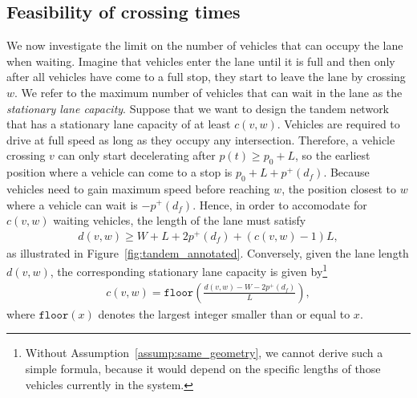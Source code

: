 \documentclass[a4paper]{article}
\theoremstyle{definition}
\theoremstyle{plain}
\begin{document}
\subsection{Feasibility of crossing times}

We now investigate the limit on the number of vehicles that can occupy the lane
when waiting. Imagine that vehicles enter the lane until it is full and then
only after all vehicles have come to a full stop, they start to leave the lane
by crossing $w$. We refer to the maximum number of vehicles that can wait in the
lane as the \textit{stationary lane capacity}.
%
Suppose that we want to design the tandem network that has a stationary lane
capacity of at least $c(v,w)$. Vehicles are required to drive at full speed as
long as they occupy any intersection. Therefore, a vehicle crossing $v$ can only
start decelerating after $p(t) \geq p_{0} + L$, so the earliest position where a
vehicle can come to a stop is $p_{0} + L + p^{+}(d_{f})$.
%
Because vehicles need to gain maximum speed before reaching $w$,
the position closest to $w$ where a vehicle can wait is $- p^{+}(d_{f})$.
%
Hence, in order to accomodate for $c(v,w)$ waiting vehicles, the length of the
lane must satisfy
\begin{align*}
  d(v, w) \geq W + L + 2p^{+}(d_{f}) + (c(v,w) - 1) L ,
\end{align*}
as illustrated in Figure~\ref{fig:tandem_annotated}.
%
Conversely, given the lane length $d(v,w)$, the corresponding stationary lane
capacity is given by\footnote{Without Assumption~\ref{assump:same_geometry}, we
  cannot derive such a simple formula, because it would depend on the specific
  lengths of those vehicles currently in the system.}
\begin{align*}
  c(v, w) = \texttt{floor}\left( \frac{d(v,w) - W - 2 p^{+}(d_{f})}{L} \right) ,
\end{align*}
where $\texttt{floor}(x)$ denotes the largest integer smaller than or equal to
$x$.
\end{document}
